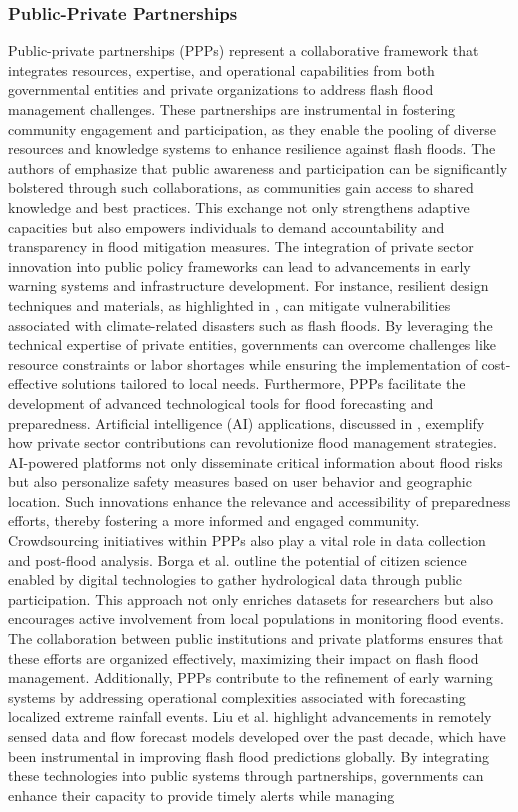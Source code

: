 \subsubsection{Public-Private Partnerships}
Public-private partnerships (PPPs) represent a collaborative framework that integrates resources, expertise, and operational capabilities from both governmental entities and private organizations to address flash flood management challenges. These partnerships are instrumental in fostering community engagement and participation, as they enable the pooling of diverse resources and knowledge systems to enhance resilience against flash floods. The authors of emphasize that public awareness and participation can be significantly bolstered through such collaborations, as communities gain access to shared knowledge and best practices. This exchange not only strengthens adaptive capacities but also empowers individuals to demand accountability and transparency in flood mitigation measures. The integration of private sector innovation into public policy frameworks can lead to advancements in early warning systems and infrastructure development. For instance, resilient design techniques and materials, as highlighted in \citep{Saad2024}, can mitigate vulnerabilities associated with climate-related disasters such as flash floods. By leveraging the technical expertise of private entities, governments can overcome challenges like resource constraints or labor shortages while ensuring the implementation of cost-effective solutions tailored to local needs. Furthermore, PPPs facilitate the development of advanced technological tools for flood forecasting and preparedness. Artificial intelligence (AI) applications, discussed in \citep{Abegaz2024}, exemplify how private sector contributions can revolutionize flood management strategies. AI-powered platforms not only disseminate critical information about flood risks but also personalize safety measures based on user behavior and geographic location. Such innovations enhance the relevance and accessibility of preparedness efforts, thereby fostering a more informed and engaged community. Crowdsourcing initiatives within PPPs also play a vital role in data collection and post-flood analysis. Borga et al. \citep{Borga2019} outline the potential of citizen science enabled by digital technologies to gather hydrological data through public participation. This approach not only enriches datasets for researchers but also encourages active involvement from local populations in monitoring flood events. The collaboration between public institutions and private platforms ensures that these efforts are organized effectively, maximizing their impact on flash flood management. Additionally, PPPs contribute to the refinement of early warning systems by addressing operational complexities associated with forecasting localized extreme rainfall events. Liu et al. \citep{Liu2018} highlight advancements in remotely sensed data and flow forecast models developed over the past decade, which have been instrumental in improving flash flood predictions globally. By integrating these technologies into public systems through partnerships, governments can enhance their capacity to provide timely alerts while managing 